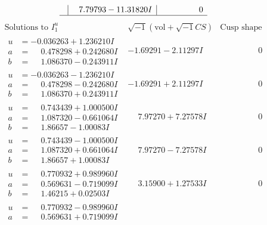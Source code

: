 \documentclass[1p]{elsarticle_modified}
\theoremstyle{definition}
\newcommand{\I}{\sqrt{-1}}
\begin{document}
$$\begin{array}{c|c|c}
 & \phantom{-}7.79793 - 11.31820 I & \phantom{-0.000000 } 0\\
 \hline 
 \end{array}$$\newpage$$\begin{array}{c|c|c}  
\text{Solutions to }I^u_{1}& \I (\text{vol} + \sqrt{-1}CS) & \text{Cusp shape}\\
 \hline 
\begin{aligned}
u &= -0.036263 + 1.236210 I \\
a &= \phantom{-}0.478298 + 0.242680 I \\
b &= \phantom{-}1.086370 - 0.243911 I\end{aligned}
 & -1.69291 - 2.11297 I & \phantom{-0.000000 } 0 \\ \hline\begin{aligned}
u &= -0.036263 - 1.236210 I \\
a &= \phantom{-}0.478298 - 0.242680 I \\
b &= \phantom{-}1.086370 + 0.243911 I\end{aligned}
 & -1.69291 + 2.11297 I & \phantom{-0.000000 } 0 \\ \hline\begin{aligned}
u &= \phantom{-}0.743439 + 1.000500 I \\
a &= \phantom{-}1.087320 - 0.661064 I \\
b &= \phantom{-}1.86657 - 1.00083 I\end{aligned}
 & \phantom{-}7.97270 + 7.27578 I & \phantom{-0.000000 } 0 \\ \hline\begin{aligned}
u &= \phantom{-}0.743439 - 1.000500 I \\
a &= \phantom{-}1.087320 + 0.661064 I \\
b &= \phantom{-}1.86657 + 1.00083 I\end{aligned}
 & \phantom{-}7.97270 - 7.27578 I & \phantom{-0.000000 } 0 \\ \hline\begin{aligned}
u &= \phantom{-}0.770932 + 0.989960 I \\
a &= \phantom{-}0.569631 - 0.719099 I \\
b &= \phantom{-}1.46215 + 0.02503 I\end{aligned}
 & \phantom{-}3.15900 + 1.27533 I & \phantom{-0.000000 } 0 \\ \hline\begin{aligned}
u &= \phantom{-}0.770932 - 0.989960 I \\
a &= \phantom{-}0.569631 + 0.719099 I \\

\end{aligned}
\end{array}$$
\end{document}

